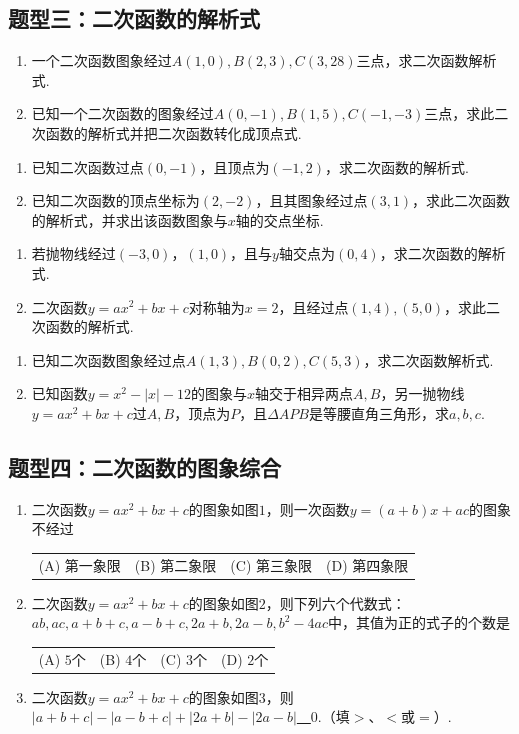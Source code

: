 \documentclass[10pt]{ctexart}
\newcommand{\abs}[1]{\left| #1 \right|}
\newcommand{\onech}[4]{
\renewcommand\arraystretch{1.4}
\begin{tabularx}{\linewidth}{XXXX}
\setlength\tabcolsep{0pt}
(A) #1 & (B) #2 & (C) #3 & (D) #4 \\
\end{tabularx}
\unskip \unskip}
\begin{document}
\subsection{题型三：二次函数的解析式}
\begin{dkyi}{}{}
  \begin{enumerate}[(1)]
  \item 一个二次函数图象经过$A(1,0),B(2,3),C(3,28)$三点，求二次函数解析式.
  \item 已知一个二次函数的图象经过$A(0,-1),B(1,5),C(-1,-3)$三点，求此二次函数的解析式并把二次函数转化成顶点式.
  \end{enumerate}
\end{dkyi}
\begin{dkyi}{}{}
  \begin{enumerate}[(1)]
  \item 已知二次函数过点$(0,-1)$，且顶点为$(-1,2)$，求二次函数的解析式.
  \item 已知二次函数的顶点坐标为$(2,-2)$，且其图象经过点$(3,1)$，求此二次函数的解析式，并求出该函数图象与$x$轴的交点坐标.
  \end{enumerate}
\end{dkyi}
\begin{jply}{}{}
   \begin{enumerate}[(1)]
   \item 若抛物线经过$(-3,0)$，$(1,0)$，且与$y$轴交点为$(0,4)$，求二次函数的解析式.
   \item 二次函数$y=ax^2+bx+c$对称轴为$x=2$，且经过点$(1,4),(5,0)$，求此二次函数的解析式.
   \end{enumerate}
\end{jply}
\begin{jply}{}{}
   \begin{enumerate}[(1)]
   \item 已知二次函数图象经过点$A(1,3),B(0,2),C(5,3)$，求二次函数解析式.
   \item 已知函数$y=x^2-\abs{x}-12$的图象与$x$轴交于相异两点$A,B$，另一抛物线$y=ax^2+bx+c$过$A,B$，顶点为$P$，且$\Delta APB$是等腰直角三角形，求$a,b,c$.
   \end{enumerate}
\end{jply}
\subsection{题型四：二次函数的图象综合}
\begin{dkyi}{}{}
  \begin{enumerate}[(1)]
  \item 二次函数$y=ax^2+bx+c$的图象如图$1$，则一次函数$y=(a+b)x+ac$的图象不经过
  
  \onech{第一象限}{第二象限}{第三象限}{第四象限}
  \item 二次函数$y=ax^2+bx+c$的图象如图$2$，则下列六个代数式：$ab,ac,a+b+c,a-b+c,2a+b,2a-b,b^2-4ac$中，其值为正的式子的个数是
  
  \onech{$5$个}{$4$个}{$3$个}{$2$个}
  \item 二次函数$y=ax^2+bx+c$的图象如图$3$，则$\abs{a+b+c}-\abs{a-b+c}+\abs{2a+b}-\abs{2a-b}$\underline{~\hspace{1cm}~}$0$.（填$>$、$<$或$=$）.
  \end{enumerate}
\end{dkyi}
\end{document}
